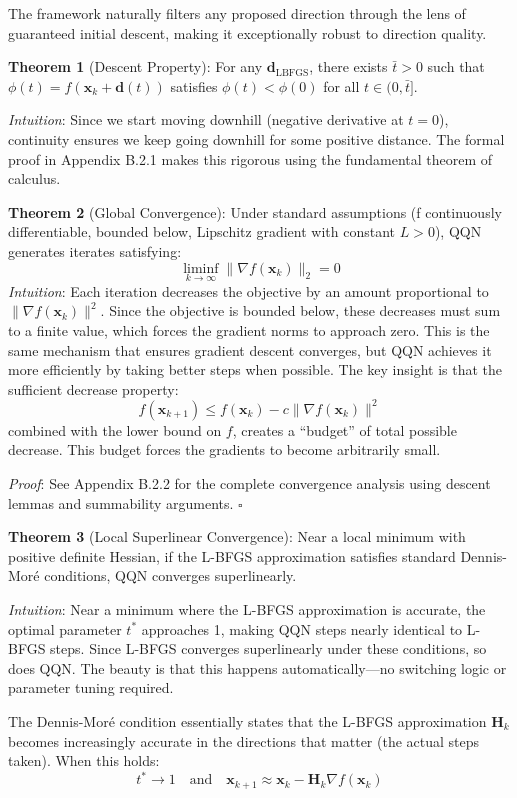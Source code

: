The framework naturally filters any proposed direction through the lens of guaranteed initial descent, making it exceptionally robust to direction quality.

\textbf{Theorem 1} (Descent Property): For any \(\mathbf{d}_{\text{LBFGS}}\), there exists \(\bar{t} > 0\) such that \(\phi(t) = f(\mathbf{x}_k + \mathbf{d}(t))\) satisfies \(\phi(t) < \phi(0)\) for all \(t \in (0, \bar{t}]\).

\emph{Intuition}: Since we start moving downhill (negative derivative at \(t=0\)), continuity ensures we keep going downhill for some positive distance. The formal proof in Appendix B.2.1 makes this rigorous using the fundamental theorem of calculus.

\textbf{Theorem 2} (Global Convergence): Under standard assumptions (f continuously differentiable, bounded below, Lipschitz gradient with constant \(L > 0\)), QQN generates iterates satisfying:
\[\liminf_{k \to \infty} \|\nabla f(\mathbf{x}_k)\|_2 = 0\]
\emph{Intuition}: Each iteration decreases the objective by an amount proportional to \(\|\nabla f(\mathbf{x}_k)\|^2\). Since the objective is bounded below, these decreases must sum to a finite value, which forces the gradient norms to approach zero. This is the same mechanism that ensures gradient descent converges, but QQN achieves it more efficiently by taking better steps when possible.
The key insight is that the sufficient decrease property:
\[f(\mathbf{x}_{k+1}) \leq f(\mathbf{x}_k) - c\|\nabla f(\mathbf{x}_k)\|^2\]
combined with the lower bound on \(f\), creates a ``budget'' of total possible decrease. This budget forces the gradients to become arbitrarily small.

\emph{Proof}: See Appendix B.2.2 for the complete convergence analysis using descent lemmas and summability arguments. \(\square\)

\textbf{Theorem 3} (Local Superlinear Convergence): Near a local minimum with positive definite Hessian, if the L-BFGS approximation satisfies standard Dennis-Moré conditions, QQN converges superlinearly.

\emph{Intuition}: Near a minimum where the L-BFGS approximation is accurate, the optimal parameter \(t^*\) approaches 1, making QQN steps nearly identical to L-BFGS steps. Since L-BFGS converges superlinearly under these conditions, so does QQN. The beauty is that this happens automatically---no switching logic or parameter tuning required.

The Dennis-Moré condition essentially states that the L-BFGS approximation \(\mathbf{H}_k\) becomes increasingly accurate in the directions that matter (the actual steps taken). When this holds:
\[t^* \to 1 \quad \text{and} \quad \mathbf{x}_{k+1} \approx \mathbf{x}_k - \mathbf{H}_k\nabla f(\mathbf{x}_k)\]

